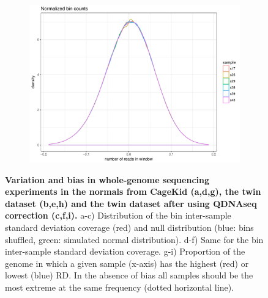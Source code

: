 \begin{figure}[htp]
\begin{subfigure}[b]{.3\textwidth}
    \includegraphics[width=\linewidth,page=6]{figures/twin-biasWGS-QDNAseq.pdf}
    \caption{}
  \end{subfigure}
  \caption[Variation and bias in whole-genome sequencing experiments in CageKid and the twin dataset.]{{\bf Variation and bias in whole-genome sequencing experiments in the normals from CageKid (a,d,g), the twin dataset (b,e,h) and the twin dataset after using {\sf QDNAseq}\cite{Scheinin2014} correction (c,f,i).} {\small a-c) Distribution of the bin inter-sample standard deviation coverage (red) and null distribution (blue: bins shuffled, green: simulated normal distribution). d-f) Same for the bin inter-sample standard deviation coverage. g-i) Proportion of the genome in which a given sample (x-axis) has the highest (red) or lowest (blue) RD. In the absence of bias all samples should be the most extreme at the same frequency (dotted horizontal line). }}
  \label{fig:wgsbias2}
\end{figure}

